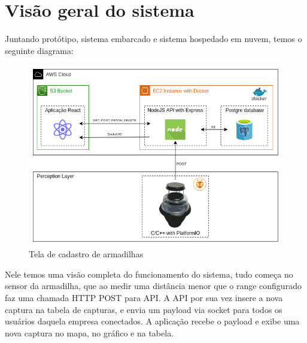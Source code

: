 \documentclass[
	12pt,				%
	openright,			%
	oneside,			%
	a4paper,			%
	chapter=TITLE,		%
	english,			%
	brazil				%
	]{abntex2}
\begin{document}
\section{Visão geral do sistema}

Juntando protótipo, sistema embarcado e sistema hospedado em nuvem, temos o seguinte diagrama:

\begin{figure}[H]
    \centering
    \includegraphics[scale=0.6]{imagens/diagramacloudarmadilha.png}
    \caption{Tela de cadastro de armadilhas}
        \label{fig:diagramacloudarmadilha}
    \end{figure}


Nele temos uma visão completa do funcionamento do sistema, tudo começa no sensor da armadilha, que ao medir uma distância menor
que o range configurado faz uma chamada HTTP POST para API. A API por sua vez insere a nova captura na tabela de capturas, e 
envia um payload via socket para todos os usuários daquela empresa conectados. A aplicação recebe o payload e exibe uma nova captura
no mapa, no gráfico e na tabela.
\end{document}
